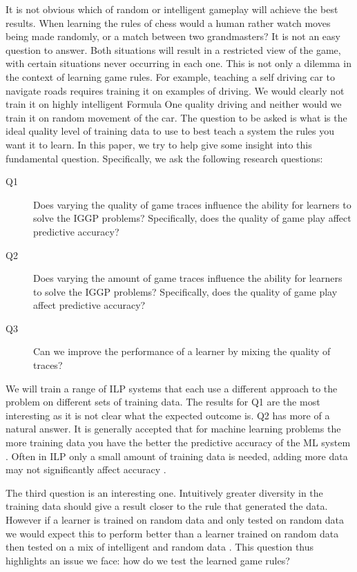 It is not obvious which of random or intelligent gameplay will achieve the best results. When learning the rules of chess would a human rather watch moves being made randomly, or a match between two grandmasters? It is not an easy question to answer. Both situations will result in a restricted view of the game, with certain situations never occurring in each one. This is not only a dilemma in the context of learning game rules. For example, teaching a self driving car to navigate roads requires training it on examples of driving. We would clearly not train it on highly intelligent Formula One quality driving and neither would we train it on random movement of the car. The question to be asked is what is the ideal quality level of training data to use to best teach a system the rules you want it to learn. In this paper, we try to help give some insight into this fundamental question. Specifically, we ask the following research questions:

\begin{description}
\item[Q1] Does varying the quality of game traces influence the ability for learners to solve the IGGP problems? Specifically, does the quality of game play affect predictive accuracy?
\item[Q2] Does varying the amount of game traces influence the ability for learners to solve the IGGP problems? Specifically, does the quality of game play affect predictive accuracy?
\item[Q3] Can we improve the performance of a learner by mixing the quality of traces?
\end{description}

We will train a range of ILP systems that each use a different approach to the problem on different sets of training data. The results for Q1 are the most interesting as it is not clear what the expected outcome is. Q2 has more of a natural answer. It is generally accepted that for machine learning problems the more training data you have the better the predictive accuracy of the ML system \cite{Mitchell/MachineLearing}. Often in ILP only a small amount of training data is needed, adding more data may not significantly affect accuracy \cite{Muggleton/ILP}.

The third question is an interesting one. Intuitively greater diversity in the training data should give a result closer to the rule that generated the data. However if a learner is trained on random data and only tested on random data we would expect this to perform better than a learner trained on random data then tested on a mix of intelligent and random data \cite{Mitchell/MachineLearing}. This question thus highlights an issue we face: how do we test the learned game rules?

